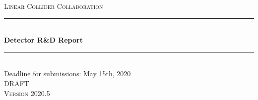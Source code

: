 \documentclass[10pt,final]{report}
\begin{document}
\begin{titlepage} 
    \newcommand{\HRule}{\rule{\linewidth}{0.5mm}} %
	\center %
	
	
	\textsc{\LARGE Linear Collider Collaboration}\\[1.5cm] %
		
	
	
	\HRule\\[0.4cm]
	
	{\huge\bfseries Detector R\&D Report}\\[0.4cm] %
	
	\HRule\\[1.5cm]

	{\Large \color{red}Deadline for submissions: May 15th, 2020}\\
	{\Large DRAFT}\\
    \textsc{Version 2020.5}\\[0.5cm] %


\end{titlepage}
\end{document}
